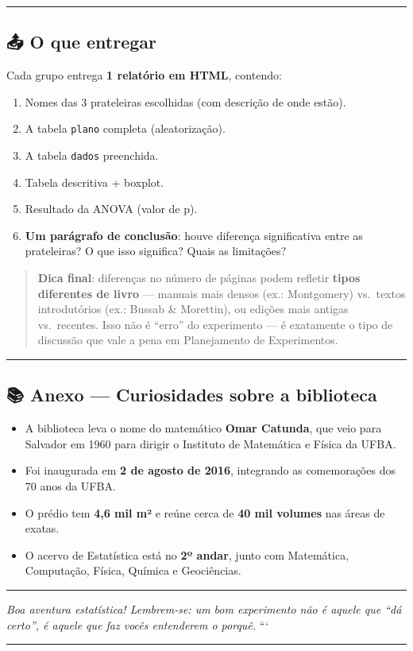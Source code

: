 \documentclass[
]{article}
\providecommand{\tightlist}{%
  \setlength{\itemsep}{0pt}\setlength{\parskip}{0pt}}
\begin{document}
\begin{center}\rule{0.5\linewidth}{0.5pt}\end{center}

\subsection{📤 O que entregar}\label{o-que-entregar}

Cada grupo entrega \textbf{1 relatório em HTML}, contendo:

\begin{enumerate}
\def\labelenumi{\arabic{enumi}.}
\tightlist
\item
  Nomes das 3 prateleiras escolhidas (com descrição de onde estão).
\item
  A tabela \texttt{plano} completa (aleatorização).
\item
  A tabela \texttt{dados} preenchida.
\item
  Tabela descritiva + boxplot.
\item
  Resultado da ANOVA (valor de p).
\item
  \textbf{Um parágrafo de conclusão}: houve diferença significativa
  entre as prateleiras? O que isso significa? Quais as limitações?
\end{enumerate}

\begin{quote}
\textbf{Dica final}: diferenças no número de páginas podem refletir
\textbf{tipos diferentes de livro} --- manuais mais densos (ex.:
Montgomery) vs.~textos introdutórios (ex.: Bussab \& Morettin), ou
edições mais antigas vs.~recentes. Isso não é ``erro'' do experimento
--- é exatamente o tipo de discussão que vale a pena em Planejamento de
Experimentos.
\end{quote}

\begin{center}\rule{0.5\linewidth}{0.5pt}\end{center}

\subsection{📚 Anexo --- Curiosidades sobre a
biblioteca}\label{anexo-curiosidades-sobre-a-biblioteca}

\begin{itemize}
\tightlist
\item
  A biblioteca leva o nome do matemático \textbf{Omar Catunda}, que veio
  para Salvador em 1960 para dirigir o Instituto de Matemática e Física
  da UFBA.
\item
  Foi inaugurada em \textbf{2 de agosto de 2016}, integrando as
  comemorações dos 70 anos da UFBA.
\item
  O prédio tem \textbf{4,6 mil m²} e reúne cerca de \textbf{40 mil
  volumes} nas áreas de exatas.
\item
  O acervo de Estatística está no \textbf{2º andar}, junto com
  Matemática, Computação, Física, Química e Geociências.
\end{itemize}

\begin{center}\rule{0.5\linewidth}{0.5pt}\end{center}

\emph{Boa aventura estatística! Lembrem-se: um bom experimento não é
aquele que ``dá certo'', é aquele que faz vocês entenderem o porquê.}
```

\begin{center}\rule{0.5\linewidth}{0.5pt}\end{center}
\end{document}
